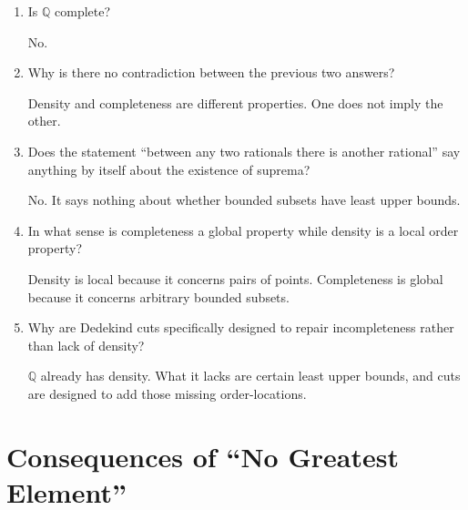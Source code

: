 \documentclass{essay}
\begin{document}
\begin{enumerate}[label=\arabic*., itemsep=10pt]
\begin{answer}
Yes.
\end{answer}

\item Is $\mathbb{Q}$ complete?

\begin{answer}
No.
\end{answer}

\item Why is there no contradiction between the previous two answers?

\begin{answer}
Density and completeness are different properties. One does not imply the other.
\end{answer}

\item Does the statement
``between any two rationals there is another rational''
say anything by itself about the existence of suprema?

\begin{answer}
No. It says nothing about whether bounded subsets have least upper bounds.
\end{answer}

\item In what sense is completeness a global property while density is a local order property?

\begin{answer}
Density is local because it concerns pairs of points. Completeness is global because it concerns arbitrary bounded subsets.
\end{answer}

\item Why are Dedekind cuts specifically designed to repair incompleteness rather than lack of density?

\begin{answer}
$\mathbb{Q}$ already has density. What it lacks are certain least upper bounds, and cuts are designed to add those missing order-locations.
\end{answer}

\end{enumerate}

\section{Consequences of ``No Greatest Element''}
\end{document}
